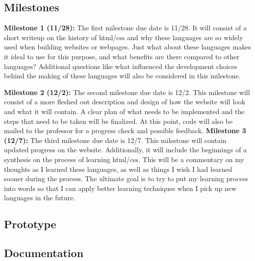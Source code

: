 \documentclass{article}
\theoremstyle{theorem}
\theoremstyle{definition}
\theoremstyle{remark}
\begin{document}
\subsection{Milestones}
\textbf{Milestone 1 (11/28):} 
\newline\indent
The first milestone due date is 11/28. It will consist of a short writeup on the history of html/css and why these languages are so widely used when building websites or webpages. Just what about these languages makes it ideal to use for this purpose, and what benefits are there compared to other languages? Additional questions like what influenced the development choices behind the making of these languages will also be considered in this milestone.\newline

\noindent\textbf{Milestone 2 (12/2):}
\newline\indent
The second milestone due date is 12/2. This milestone will consist of a more fleshed out description and design of how the website will look and what it will contain. A clear plan of what needs to be implemented and the steps that need to be taken will be finalized. At this point, code will also be mailed to the professor for a progress check and possible feedback.\newline
\noindent\textbf{Milestone 3 (12/7):}
\newline\indent
The third milestone due date is 12/7. This milestone will contain updated progress on the website. Additionally, it will include the beginnings of a synthesis on the process of learning html/css. This will be a commentary on my thoughts as I learned these languages, as well as things I wish I had learned sooner during the process. The ultimate goal is to try to put my learning process into words so that I can apply better learning techniques when I pick up new languages in the future.

\subsection{Prototype}
\subsection{Documentation}
\end{document}
